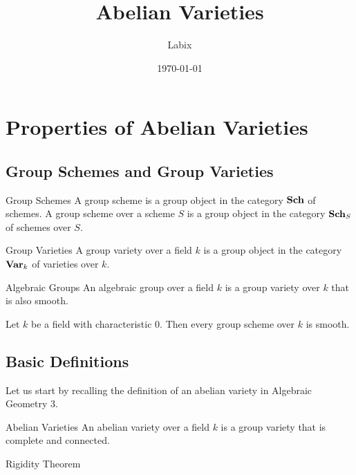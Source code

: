 \documentclass[a4paper]{article}
\title{Abelian Varieties}
\author{Labix}
\date{\today}
\begin{document}
\maketitle
\begin{abstract}
\begin{itemize}
\end{itemize}
\end{abstract}
\pagebreak
\tableofcontents

\pagebreak
\section{Properties of Abelian Varieties}
\subsection{Group Schemes and Group Varieties}
\begin{defn}{Group Schemes}{} A group scheme is a group object in the category $\bold{Sch}$ of schemes. A group scheme over a scheme $S$ is a group object in the category $\bold{Sch}_S$ of schemes over $S$. 
\end{defn}

\begin{defn}{Group Varieties}{} A group variety over a field $k$ is a group object in the category $\bold{Var}_k$ of varieties over $k$. 
\end{defn}

\begin{defn}{Algebraic Groups}{} An algebraic group over a field $k$ is a group variety over $k$ that is also smooth. 
\end{defn}

\begin{prp}{}{} Let $k$ be a field with characteristic $0$. Then every group scheme over $k$ is smooth. 
\end{prp}

\subsection{Basic Definitions}
Let us start by recalling the definition of an abelian variety in Algebraic Geometry 3. 

\begin{defn}{Abelian Varieties}{} An abelian variety over a field $k$ is a group variety that is complete and connected. 
\end{defn}

\begin{thm}{Rigidity Theorem}{}
\end{thm}
\end{document}
